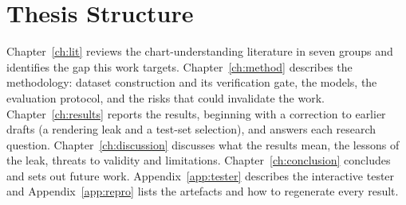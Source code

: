 \section{Thesis Structure}

Chapter~\ref{ch:lit} reviews the chart-understanding literature in seven groups
and identifies the gap this work targets. Chapter~\ref{ch:method} describes the
methodology: dataset construction and its verification gate, the models, the
evaluation protocol, and the risks that could invalidate the work.
Chapter~\ref{ch:results} reports the results, beginning with a correction to earlier
drafts (a rendering leak and a test-set selection), and answers each research question.
Chapter~\ref{ch:discussion} discusses what the results mean, the lessons of the leak,
threats to validity and limitations. Chapter~\ref{ch:conclusion} concludes and sets out
future work. Appendix~\ref{app:tester} describes the interactive tester and
Appendix~\ref{app:repro} lists the artefacts and how to regenerate every result.
